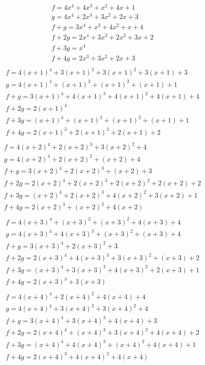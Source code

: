 \documentclass[bibliography=totoc, a4paper, 12pt]{extarticle}
\begin{document}
$$\begin{array}{l}
f = 4x^4 + 4x^3 + x^2 + 4x + 1\\
g = 4x^4 + 2x^3 + 3x^2 + 2x + 3\\
f + g = 3x^4 + x^3 + 4x^2 + x + 4\\
f + 2g = 2x^4 + 3x^3 + 2x^2 + 3x + 2\\
f + 3g = x^4\\
f + 4g = 2x^3 + 3x^2 + 2x + 3\\
\end{array}$$
$$\begin{array}{l}
f = 4(x+1)^4 + 3(x+1)^3 + 3(x+1)^2 + 3(x+1) + 3\\
g = 4(x+1)^4 + (x+1)^3 + (x+1)^2 + (x+1) + 1\\
f + g = 3(x+1)^4 + 4(x+1)^3 + 4(x+1)^2 + 4(x+1) + 4\\
f + 2g = 2(x+1)^4\\
f + 3g = (x+1)^4 + (x+1)^3 + (x+1)^2 + (x+1) + 1\\
f + 4g = 2(x+1)^3 + 2(x+1)^2 + 2(x+1) + 2\\
\end{array}$$
$$\begin{array}{l}
f = 4(x+2)^4 + 2(x+2)^3 + 3(x+2)^2 + 4\\
g = 4(x+2)^4 + 2(x+2)^2 + (x+2) + 4\\
f + g = 3(x+2)^4 + 2(x+2)^3 + (x+2) + 3\\
f + 2g = 2(x+2)^4 + 2(x+2)^3 + 2(x+2)^2 + 2(x+2) + 2\\
f + 3g = (x+2)^4 + 2(x+2)^3 + 4(x+2)^2 + 3(x+2) + 1\\
f + 4g = 2(x+2)^3 + (x+2)^2 + 4(x+2)\\
\end{array}$$
$$\begin{array}{l}
f = 4(x+3)^4 + (x+3)^3 + (x+3)^2 + 4(x+3) + 4\\
g = 4(x+3)^4 + 4(x+3)^3 + (x+3)^2 + (x+3) + 4\\
f + g = 3(x+3)^4 + 2(x+3)^2 + 3\\
f + 2g = 2(x+3)^4 + 4(x+3)^3 + 3(x+3)^2 + (x+3) + 2\\
f + 3g = (x+3)^4 + 3(x+3)^3 + 4(x+3)^2 + 2(x+3) + 1\\
f + 4g = 2(x+3)^3 + 3(x+3)\\
\end{array}$$
$$\begin{array}{l}
f = 4(x+4)^4 + 2(x+4)^2 + 4(x+4) + 4\\
g = 4(x+4)^4 + 3(x+4)^3 + 3(x+4)^2 + 4\\
f + g = 3(x+4)^4 + 3(x+4)^3 + 4(x+4) + 3\\
f + 2g = 2(x+4)^4 + (x+4)^3 + 3(x+4)^2 + 4(x+4) + 2\\
f + 3g = (x+4)^4 + 4(x+4)^3 + (x+4)^2 + 4(x+4) + 1\\
f + 4g = 2(x+4)^3 + 4(x+4)^2 + 4(x+4)\\
\end{array}$$
\end{document}
